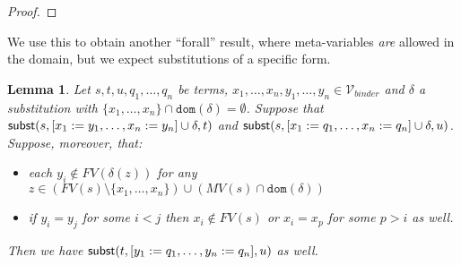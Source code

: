 \documentclass{lmcs}
\theoremstyle{theorem}\newtheorem{theorem}{Theorem}
\theoremstyle{theorem}\newtheorem{lemma}[theorem]{Lemma}
\theoremstyle{theorem}\newtheorem{corollary}[theorem]{Corollary}
\theoremstyle{definition}\newtheorem{definition}[theorem]{Definition}
\theoremstyle{definition}\newtheorem{example}[theorem]{Example}
\newcommand{\V}{\mathcal{V}}
\newcommand{\Vbound}{\mathcal{V}_{\mathit{binder}}}
\newcommand{\FV}{\mathit{FV}}
\newcommand{\FMV}{\mathit{MV}}
\newcommand{\domain}{\mathtt{dom}}
\newcommand{\avar}{x}
\newcommand{\bvar}{y}
\newcommand{\cvar}{z}
\begin{document}
\begin{proof}
\end{proof}

We use this to obtain another ``forall'' result, where meta-variables \emph{are}
allowed in the domain, but we expect substitutions of a specific form.

\begin{lemma}\label{lem:combinesubst:special}
Let $s,t,u,q_1,\dots,q_n$ be terms, $\avar_1,\dots,\avar_n,\bvar_1,\dots,\bvar_n
\in \Vbound$ and $\delta$ a substitution with $\{\avar_1,\dots,\avar_n\} \cap
\domain(\delta) = \emptyset$.  Suppose that
$\subrel{s,[\avar_1:=\bvar_1,\dots,\avar_n:=\bvar_n] \cup \delta,t}$ and
$\subrel{s,[\avar_1:=q_1,\dots,\avar_n:=q_n] \cup \delta,u}$. Suppose, moreover,
that:
\begin{itemize}
\item each $\bvar_i \notin \FV(\delta(\cvar))$ for any $\cvar \in (\FV(s)
  \setminus \{\avar_1,\dots,\avar_n\}) \cup (\FMV(s) \cap \domain(\delta))$
\item if $\bvar_i = \bvar_j$ for some $i < j$ then $\avar_i \notin \FV(s)$
  or $\avar_i = \avar_p$ for some $p > i$ as well.
\end{itemize}
Then we have $\subrel{t,[\bvar_1:=q_1,\dots,\bvar_n:=q_n],u}$ as well.
\end{lemma}
\end{document}
